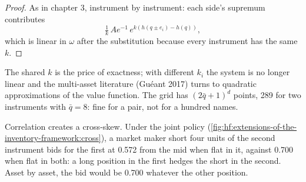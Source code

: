 \begin{proof}
As in chapter 3, instrument by instrument: each side's supremum contributes
\[
\tfrac1k\,Ae^{-1}\,e^{k(h(q\pm e_i)-h(q))},
\]
which is linear in $\omega$ after the substitution because every instrument has the same $k$.
\end{proof}

The shared $k$ is the price of exactness; with different $k_i$ the system is no longer linear and the multi-asset literature (Guéant 2017) turns to
quadratic approximations of the value function. The grid has $(2\bar q+1)^d$ points, 289 for two instruments with $\bar q=8$: fine for a pair, not
for a hundred names.

Correlation creates a cross-skew. Under the joint policy (\cref{fig:hf:extensions-of-the-inventory-framework:cross}), a market maker short four
units of the second instrument bids for the first at 0.572 from the mid when flat in it, against 0.700 when flat in both: a long position in the
first hedges the short in the second. Asset by asset, the bid would be 0.700 whatever the other position.

\begin{omfigure}

\label{fig:hf:extensions-of-the-inventory-framework:cross}
\end{omfigure}

